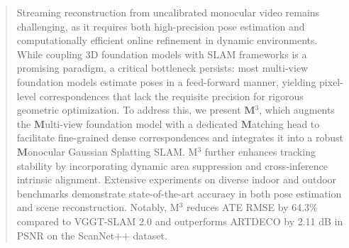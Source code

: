 \begin{abstract}
Streaming reconstruction from uncalibrated monocular video remains challenging, as it requires both high-precision pose estimation and computationally efficient online refinement in dynamic environments. While coupling 3D foundation models with SLAM frameworks is a promising paradigm, a critical bottleneck persists: most multi-view foundation models estimate poses in a feed-forward manner, yielding pixel-level correspondences that lack the requisite precision for rigorous geometric optimization. To address this, we present \textbf{M}$^3$, which augments the \textbf{M}ulti-view foundation model with a dedicated \textbf{M}atching head to facilitate fine-grained dense correspondences and integrates it into a robust \textbf{M}onocular Gaussian Splatting SLAM. M$^3$ further enhances tracking stability by incorporating dynamic area suppression and cross-inference intrinsic alignment. Extensive experiments on diverse indoor and outdoor benchmarks demonstrate state-of-the-art accuracy in both pose estimation and scene reconstruction. Notably, M$^3$ reduces ATE RMSE by 64.3\% compared to VGGT-SLAM 2.0 and outperforms ARTDECO by 2.11 dB in PSNR on the ScanNet++ dataset.
\end{abstract}
